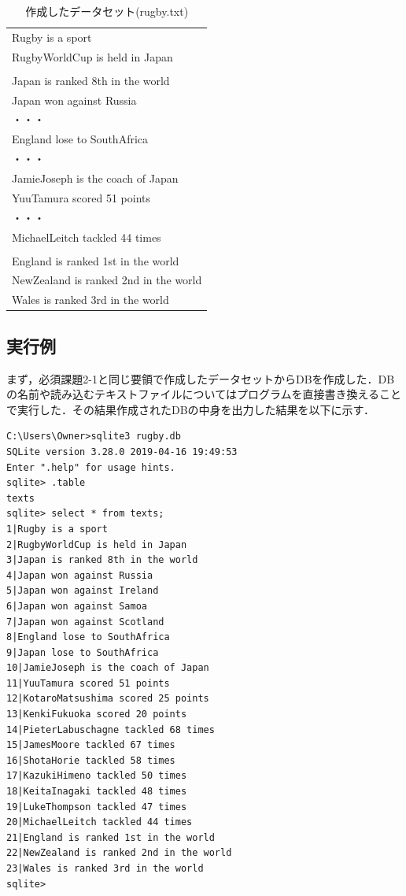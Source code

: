 \documentclass[12pt]{jarticle}
\begin{document}
\begin{table}[htb]
  \begin{center}
    \caption{作成したデータセット(rugby.txt)}
    \begin{tabular}{|l|} \hline
      Rugby is a sport \\ 
      RugbyWorldCup is held in Japan \\
       \\ 
      Japan is ranked 8th in the world \\ 
	  Japan won against Russia \\
		・・・ \\
		England lose to SouthAfrica \\
		・・・  \\
		JamieJoseph is the coach of Japan \\
		YuuTamura scored 51 points \\
		・・・ \\
		MichaelLeitch tackled 44 times \\
		 \\
		England is ranked 1st in the world \\
		NewZealand is ranked 2nd in the world \\
		Wales is ranked 3rd in the world \\ \hline
    \end{tabular}
    \label{tab:rugby}
  \end{center}
\end{table}

\subsection{実行例}
まず，必須課題2-1と同じ要領で作成したデータセットからDBを作成した．DBの名前や読み込むテキストファイルについてはプログラムを直接書き換えることで実行した．その結果作成されたDBの中身を出力した結果を以下に示す．\\

\begin{lstlisting}
C:\Users\Owner>sqlite3 rugby.db
SQLite version 3.28.0 2019-04-16 19:49:53
Enter ".help" for usage hints.
sqlite> .table
texts
sqlite> select * from texts;
1|Rugby is a sport
2|RugbyWorldCup is held in Japan
3|Japan is ranked 8th in the world
4|Japan won against Russia
5|Japan won against Ireland
6|Japan won against Samoa
7|Japan won against Scotland
8|England lose to SouthAfrica
9|Japan lose to SouthAfrica
10|JamieJoseph is the coach of Japan
11|YuuTamura scored 51 points
12|KotaroMatsushima scored 25 points
13|KenkiFukuoka scored 20 points
14|PieterLabuschagne tackled 68 times
15|JamesMoore tackled 67 times
16|ShotaHorie tackled 58 times
17|KazukiHimeno tackled 50 times
18|KeitaInagaki tackled 48 times
19|LukeThompson tackled 47 times
20|MichaelLeitch tackled 44 times
21|England is ranked 1st in the world
22|NewZealand is ranked 2nd in the world
23|Wales is ranked 3rd in the world
sqlite>
\end{lstlisting}
\end{document}
